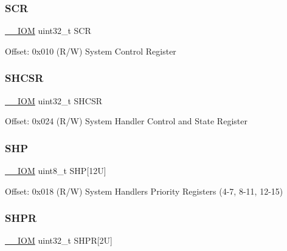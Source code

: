 \mbox{\label{struct_s_c_b___type_acac65f229cb3fcb5369a0a9e0393b8c0}} 
\subsubsection{\texorpdfstring{S\+CR}{SCR}}
{\footnotesize\ttfamily \mbox{\hyperlink{core__cm4_8h_ab6caba5853a60a17e8e04499b52bf691}{\+\_\+\+\_\+\+I\+OM}} uint32\+\_\+t S\+CR}

Offset\+: 0x010 (R/W) System Control Register \mbox{\label{struct_s_c_b___type_a44ad5c292dbd77e72f310902375a8a06}} 
\subsubsection{\texorpdfstring{S\+H\+C\+SR}{SHCSR}}
{\footnotesize\ttfamily \mbox{\hyperlink{core__cm4_8h_ab6caba5853a60a17e8e04499b52bf691}{\+\_\+\+\_\+\+I\+OM}} uint32\+\_\+t S\+H\+C\+SR}

Offset\+: 0x024 (R/W) System Handler Control and State Register \mbox{\label{struct_s_c_b___type_a293826a2c44f754e80af03d62f62f9e6}} 
\subsubsection{\texorpdfstring{S\+HP}{SHP}}
{\footnotesize\ttfamily \mbox{\hyperlink{core__cm4_8h_ab6caba5853a60a17e8e04499b52bf691}{\+\_\+\+\_\+\+I\+OM}} uint8\+\_\+t S\+HP\mbox{[}12\+U\mbox{]}}

Offset\+: 0x018 (R/W) System Handlers Priority Registers (4-\/7, 8-\/11, 12-\/15) \mbox{\label{struct_s_c_b___type_a67fd6058e3196a723d64df2d22ae6daa}} 
\subsubsection{\texorpdfstring{S\+H\+PR}{SHPR}\hspace{0.1cm}{\footnotesize\ttfamily [1/2]}}
{\footnotesize\ttfamily \mbox{\hyperlink{core__cm4_8h_ab6caba5853a60a17e8e04499b52bf691}{\+\_\+\+\_\+\+I\+OM}} uint32\+\_\+t S\+H\+PR\mbox{[}2\+U\mbox{]}}

